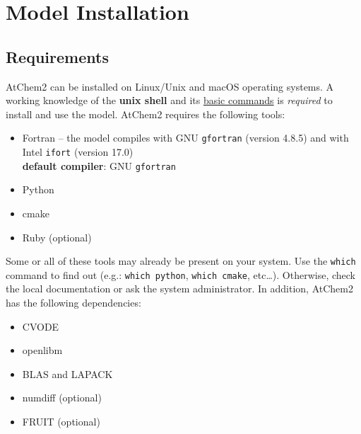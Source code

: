 %
%
%
%

\chapter{Model Installation} \label{ch:installation}

\section{Requirements} \label{sec:requirements}

AtChem2 can be installed on Linux/Unix and macOS operating systems. A
working knowledge of the \textbf{unix shell} and its
\href{https://swcarpentry.github.io/shell-novice/reference/}{basic commands}
is \emph{required} to install and use the model. AtChem2 requires the
following tools:

\begin{itemize}
\item Fortran -- the model compiles with GNU \texttt{gfortran} (version
  4.8.5) and with Intel \texttt{ifort} (version 17.0)\\
  \textbf{default compiler}: GNU \texttt{gfortran}
\item Python
\item cmake
\item Ruby (optional)
\end{itemize}

Some or all of these tools may already be present on your system. Use
the \texttt{which} command to find out (e.g.: \verb|which python|,
\verb|which cmake|, etc\ldots). Otherwise, check the local
documentation or ask the system administrator. In addition, AtChem2
has the following dependencies:

\begin{itemize}
\item CVODE
\item openlibm
\item BLAS and LAPACK
\item numdiff (optional)
\item FRUIT (optional)
\end{itemize}

